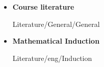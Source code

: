 \begin{frame}{\LectureFurtherLiterature}
  \begin{itemize}
    \item
      \textbf{Course literature}
      \begin{btSect}{Literature/General/General}
        \btPrintAll
      \end{btSect}
  \end{itemize}
\end{frame}


\begin{frame}{\LectureFurtherLiterature}
  \begin{itemize}
    \item
      \textbf{Mathematical Induction}
      \begin{btSect}{Literature/eng/Induction}
        \btPrintAll
      \end{btSect}
  \end{itemize}
\end{frame}
